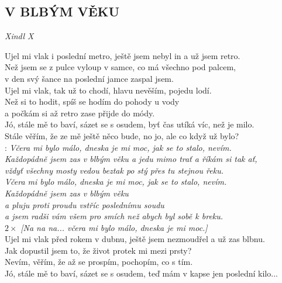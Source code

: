 \begin{flushleft}
	\section*{\Huge V BLBÝM VĚKU}
	\emph{Xindl X}
\end{flushleft}
\begin{Large}

Ujel mi vlak i poslední metro, ještě jsem nebyl in a už jsem retro.\\
Než jsem se z pulce vyloup v samce, co má všechno pod palcem,\\
v den svý šance na poslední jamce zaspal jsem.\\

Ujel mi vlak, tak už to chodí, hlavu nevěším, pojedu lodí.\\
Než si to hodit, spíš se hodím do pohody u vody\\
a počkám si až retro zase přijde do módy.\\

Jó, stále mě to baví, sázet se s osudem, byť čas utíká víc, než je milo.\\
Stále věřím, že ze mě ještě něco bude, no jo, ale co když už bylo?\\

\textregistered: \emph{Včera mi bylo málo, dneska je mi moc,
jak se to stalo, nevím.\\
Každopádně jsem zas v blbým věku a jedu mimo trať a říkám si tak ať,\\
vždyť všechny mosty vedou beztak po stý přes tu stejnou řeku.}\\

\emph{Včera mi bylo málo, dneska je mi moc, jak se to stalo, nevím.\\
Každopádně jsem zas v blbým věku\\
a pluju proti proudu vstříc poslednímu soudu\\
a jsem radši vám všem pro smích než abych byl sobě k breku.}\\

$2\times$ \emph{[Na na na... včera mi bylo málo, dneska je mi moc.]}\\

Ujel mi vlak před rokem v dubnu, ještě jsem nezmoudřel a už zas blbnu.\\
Jak dopustil jsem to, že život protek mi mezi prsty?\\
Nevím, věřím, že až se prospím, pochopím, co s tím.\\
Jó, stále mě to baví, sázet se s osudem, teď mám v kapse jen poslední kilo...\\

\textregistered \textregistered

\end{Large}

\newpage
